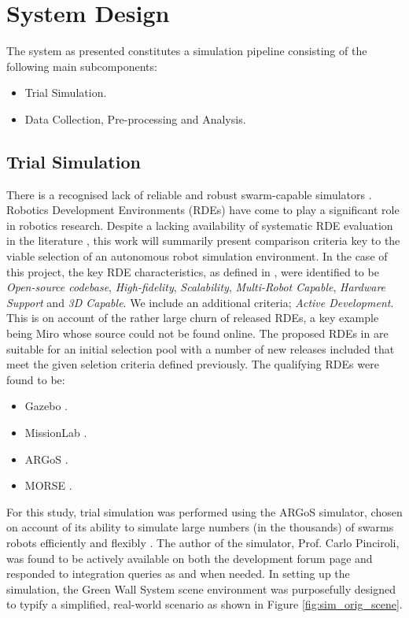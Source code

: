 \documentclass{report}
\begin{document}
\newpage

\section{System Design} \label{system_design}
The system as presented constitutes a simulation pipeline consisting of the following main subcomponents:
\begin{itemize}
	\item Trial Simulation.
	\item Data Collection, Pre-processing and Analysis.
\end{itemize}

\subsection{Trial Simulation}
There is a recognised lack of reliable and robust swarm-capable simulators \cite{Noronha2016}. Robotics Development Environments (RDEs) have come to play a significant role in robotics research. Despite a lacking availability of systematic RDE evaluation in the literature \cite{Kramer2007}, this work will summarily present comparison criteria key to the viable selection of an autonomous robot simulation environment. In the case of this project, the key RDE characteristics, as defined in \cite{Kramer2007}, were identified to be \textit{Open-source codebase}, \textit{High-fidelity}, \textit{Scalability}, \textit{Multi-Robot Capable}, \textit{Hardware Support} and \textit{3D Capable}. We include an additional criteria; \textit{Active Development}. This is on account of the rather large churn of released RDEs, a key example being Miro \cite{Enderle2001} whose source could not be found online. The proposed RDEs in \cite{Kramer2007} are suitable for an initial selection pool with a number of new releases included that meet the given seletion criteria defined previously. The qualifying RDEs were found to be:
\begin{itemize}
	\item Gazebo \cite{Koenig2004}.
	\item MissionLab \cite{MISSIONLAB}.
	\item ARGoS \cite{Pinciroli2011}.
	\item MORSE \cite{Morse2011}.
\end{itemize}

For this study, trial simulation was performed using the ARGoS simulator, chosen on account of its ability to simulate large numbers (in the thousands) of swarms robots efficiently and flexibly \cite{Pinciroli2014}. The author of the simulator, Prof. Carlo Pinciroli, was found to be actively available on both the development forum page and responded to integration queries as and when needed. In setting up the simulation, the Green Wall System scene environment was purposefully designed to typify a simplified, real-world scenario as shown in Figure \ref{fig:sim_orig_scene}.
\end{document}
